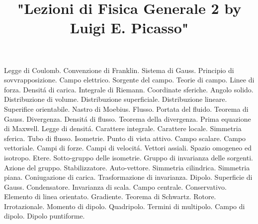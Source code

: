 

\usepackage[italian]{babel}

\title{"Lezioni di Fisica Generale 2 by Luigi E. Picasso"}


\maketitle

\begin{multicols}{3}
  Legge di Coulomb. Convenzione di Franklin. Sistema di Gauss. Principio di sovvrapposizione.
  Campo elettrico. Sorgente del campo. Teorie di campo. Linee di forza. Densit\'a di carica.
  Integrale di Riemann. Coordinate sferiche. Angolo solido. Distribuzione di volume.
  Distribuzione superficiale. Distribuzione lineare. Superifice orientabile. Nastro di Moebius. Flusso.
  Portata del fluido. Teorema di Gauss. Divergenza. Densit\'a di flusso. Teorema della divergenza.
  Prima equazione di Maxwell. Legge di densit\'a. Carattere integrale. Carattere locale. Simmetria sferica.
  Tubo di flusso. Isometrie. Punto di vista attivo. Campo scalare. Campo vettoriale. Campi di forze.
  Campi di velocit\'a. Vettori assiali. Spazio omogeneo ed isotropo. Etere. Sotto-gruppo delle isometrie.
  Gruppo di invarianza delle sorgenti. Azione del gruppo. Stabilizzatore. Auto-vettore. Simmetria cilindrica.
  Simmetria piana. Coniugazione di carica. Trasformazione di invarianza. Dipolo. Superficie di Gauss. Condensatore.
  Invarianza di scala. Campo centrale. Conservativo. Elemento di linea orientato. Gradiente. Teorema di Schwartz. Rotore.
  Irrotazionale. Momento di dipolo. Quadripolo. Termini di multipolo. Campo di dipolo. Dipolo puntiforme.
\end{multicols}

